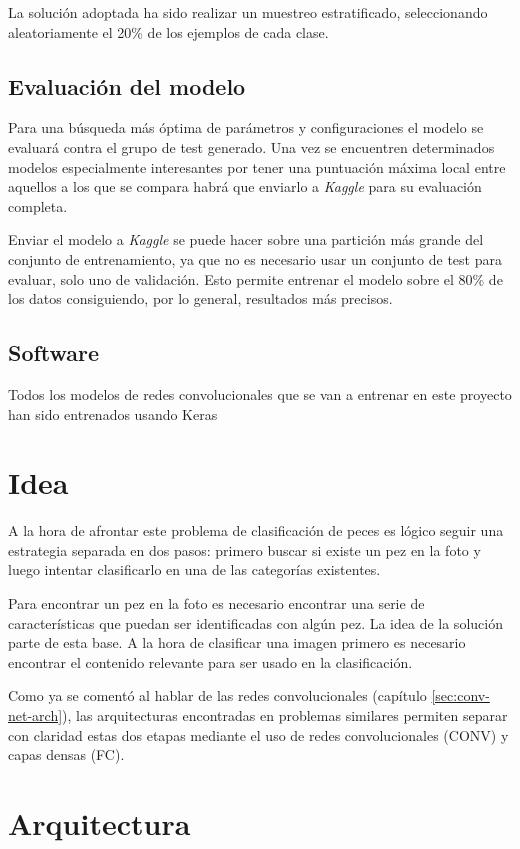 La solución adoptada ha sido realizar un muestreo estratificado, seleccionando aleatoriamente el 20\% de los ejemplos de cada clase.

\subsection{Evaluación del modelo}

Para una búsqueda más óptima de parámetros y configuraciones el modelo se evaluará contra el grupo de test generado. Una vez se encuentren determinados modelos especialmente interesantes por tener una puntuación máxima local entre aquellos a los que se compara habrá que enviarlo a \textit{Kaggle} para su evaluación completa.

Enviar el modelo a \textit{Kaggle} se puede hacer sobre una partición más grande del conjunto de entrenamiento, ya que no es necesario usar un conjunto de test para evaluar, solo uno de validación. Esto permite entrenar el modelo sobre el 80\% de los datos consiguiendo, por lo general, resultados más precisos.

\subsection{Software}

Todos los modelos de redes convolucionales que se van a entrenar en este proyecto han sido entrenados usando Keras
\section{Idea}
A la hora de afrontar este problema de clasificación de peces es lógico
seguir una estrategia separada en dos pasos: primero buscar si
existe un pez en la foto y luego intentar clasificarlo en una de las 
categorías existentes. 

Para encontrar un pez en la foto es necesario encontrar una serie de
características que puedan ser identificadas con algún pez. La idea de 
la solución parte de esta base. A la hora de clasificar una imagen
primero es necesario encontrar el contenido relevante para ser usado
en la clasificación.

Como ya se comentó al hablar de las redes convolucionales (capítulo \ref{sec:conv-net-arch}),
las arquitecturas encontradas en problemas similares \parencite{krizhevsky2012imagenet}
permiten separar con claridad estas dos etapas mediante el uso de redes convolucionales (CONV) y capas densas (FC).

\section{Arquitectura}

